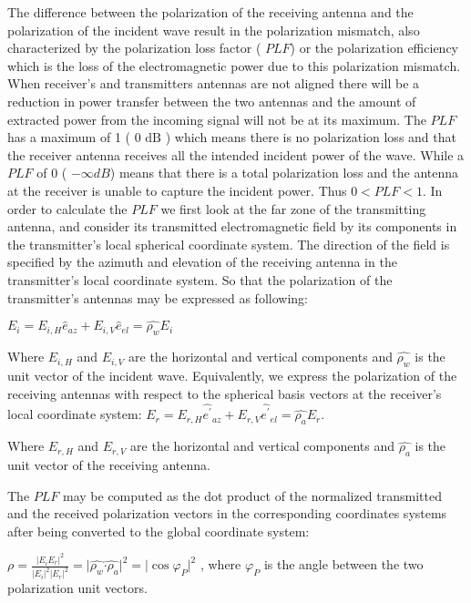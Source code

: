 The difference between the polarization of the receiving antenna and the polarization of the incident wave result in the polarization mismatch, also characterized by the polarization loss factor ( $PLF$) or the polarization efficiency which is the loss of the electromagnetic power due to this polarization mismatch. When receiver’s and transmitters antennas are not aligned\textcolor[HTML]{BFBFBF}{ }there will be a reduction in power transfer between the two antennas and the amount of extracted power from the incoming signal will not be at its maximum. The $PLF$ has a maximum of 1 ( $\text{0 dB}$ ) which means there is no polarization loss and that the receiver antenna receives all the intended incident power of the wave. While a $PLF$ of 0 ( $ -\infty dB$) means that there is a total polarization loss and the antenna at the receiver is unable to capture the incident power. Thus  $0<PLF<1$. In order to calculate the  \( PLF \)  we first look at the far zone of the transmitting antenna, and consider its transmitted electromagnetic field by its components in the transmitter's local spherical coordinate system. The direction of the field is specified by the azimuth and elevation of the receiving antenna in the transmitter's local coordinate system. So that the polarization of the transmitter's antennas may be expressed as following:

$E_{i}= E_{i,H}\hat{e}_{az}+ E_{i,V}\hat{e}_{el}= \widehat{ \rho _{w}}E_{i}$


Where  $E_{i,H}$ and  $E_{i,V}$  are the horizontal and vertical components and  $\widehat{ \rho _{w}}$ is the unit vector of the incident wave. Equivalently, we express the polarization of the receiving antennas with respect to the spherical basis vectors at the receiver's local coordinate system:  $E_{r}= E_{r,H}\widehat{e^{'}}_{az}+ E_{r,V}\widehat{e^{'}}_{el}= \widehat{ \rho _{a}}E_{r}$.



Where  $E_{r,H}$ and $E_{r,V}$ are the horizontal and vertical components and $\widehat{ \rho _{a}}$ is the unit vector of the receiving antenna.


The  $PLF$ may be computed as the dot product of the normalized transmitted and the received polarization vectors in the corresponding coordinates systems after being converted to the global coordinate system:



$\rho =\frac{ \vert E_{i}E_{r} \vert ^{2}}{ \vert E_{i} \vert ^{2} \vert E_{r} \vert ^{2}}=  \vert \widehat{ \rho _{w}}\widehat{ \cdot  \rho _{a}} \vert ^{2}=  \vert \cos  \varphi _{P} \vert ^{2}$ , where $\varphi _{P}$ is the angle between the two polarization unit vectors.






